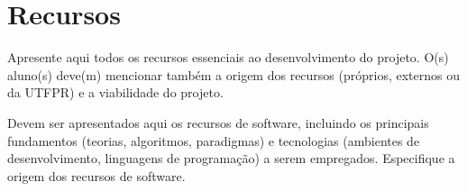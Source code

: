 \chapter{Recursos}

Apresente aqui todos os recursos essenciais ao desenvolvimento do projeto. O(s) aluno(s) deve(m) mencionar também a origem dos recursos (próprios, externos ou da UTFPR) e a viabilidade do projeto.

Devem ser apresentados aqui os recursos de software, incluindo os principais fundamentos (teorias, algoritmos, paradigmas) e tecnologias (ambientes de desenvolvimento, linguagens de programação) a serem empregados. Especifique a origem dos recursos de software.